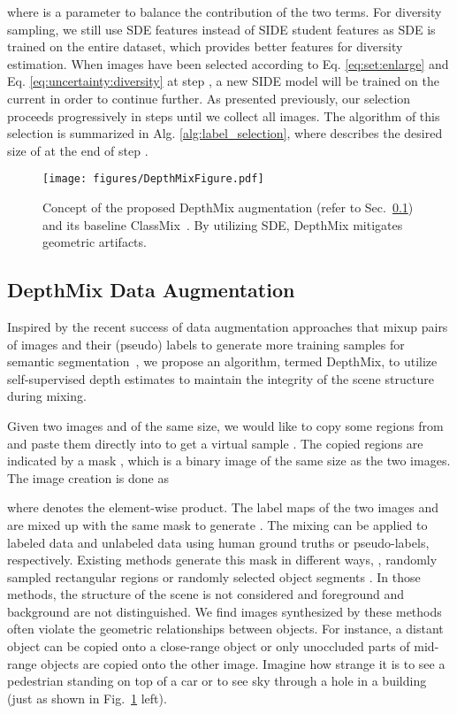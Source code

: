 \documentclass[final]{cvpr}
\begin{document}
where  is a parameter to balance the contribution of the two terms. For diversity sampling, we still use SDE features instead of SIDE student features as SDE is trained on the entire dataset, which provides better features for diversity estimation.
When  images have been selected according to Eq. \ref{eq:set:enlarge} and Eq. \ref{eq:uncertainty:diversity} at step , a new SIDE model will be trained on the current  in order to continue further.
As presented previously, our selection proceeds progressively in  steps until we collect all  images. The algorithm of this selection is summarized in Alg. \ref{alg:label_selection}, where  describes the desired size of  at the end of step .

\begin{figure}[tb]
\centering
\texttt{[image: figures/DepthMixFigure.pdf]}
\caption{Concept of the proposed DepthMix augmentation (refer to Sec.~\ref{sec:depthmix}) and its baseline ClassMix~\cite{olsson2020classmix}. By utilizing SDE, DepthMix mitigates geometric artifacts.}
\label{fig:depthmix}
\end{figure}


\subsection{DepthMix Data Augmentation}
\label{sec:depthmix}

Inspired by the recent success of data augmentation approaches that mixup pairs of images and their (pseudo) labels to generate more training samples for semantic segmentation~\cite{yun2019cutmix, french2019consistency, olsson2020classmix}, we propose an algorithm, termed DepthMix, to utilize self-supervised depth estimates to maintain the integrity of the scene structure during mixing.

Given two images  and  of the same size, we would like to copy some regions from  and paste them directly into  to get a virtual sample . The copied regions are indicated by a mask , which is a binary image of the same size as the two images. The image creation is done as

where  denotes the element-wise product. 
The label maps of the two images  and  are mixed up with the same mask  to generate . The mixing can be applied to labeled data and unlabeled data using human ground truths or pseudo-labels, respectively.
Existing methods generate this mask  in different ways, \eg, randomly sampled rectangular regions \cite{yun2019cutmix, french2019consistency} or randomly selected object segments \cite{olsson2020classmix}.
In those methods, the structure of the scene is not considered and foreground and background are not distinguished.
We find images synthesized by these methods often violate the geometric relationships between objects. For instance, a distant object can be copied onto a close-range object or only unoccluded parts of mid-range objects are copied onto the other image. Imagine how strange it is to see a pedestrian standing on top of a car or to see sky through a hole in a building (just as shown in Fig.~\ref{fig:depthmix} left).
\end{document}
